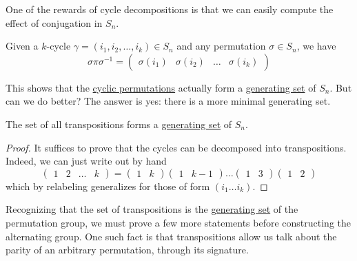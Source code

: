   One of the rewards of cycle decompositions is that we can easily compute the effect of conjugation in $S_n$. 

  \begin{lemma}
    \label{thm:conjugation-is-easy-with-cycle-notation}
    Given a $k$-cycle $\gamma = (i_1, i_2, \ldots, i_k) \in S_n$ and any permutation $\sigma \in S_n$, we have 
    \begin{equation}
      \sigma \pi \sigma^{-1} = \begin{pmatrix} \sigma(i_1) & \sigma(i_2) & \ldots & \sigma(i_k) \end{pmatrix}
    \end{equation}
  \end{lemma}

  This shows that the \hyperref[def:cyclic-permutation]{cyclic permutations} actually form a \hyperref[def:generating-set]{generating set} of $S_n$. But can we do better? The answer is yes: there is a more minimal generating set. 

  \begin{corollary}
		\label{thm:transposition_decomposition}
    The set of all transpositions forms a \hyperref[def:generating-set]{generating set} of $S_{n}$. 
  \end{corollary}
  \begin{proof}
    It suffices to prove that the cycles can be decomposed into transpositions. Indeed, we can just write out by hand 
    \begin{equation}
      \begin{pmatrix} 1 & 2 & \ldots & k \end{pmatrix} = \begin{pmatrix} 1 & k \end{pmatrix} \begin{pmatrix} 1 & k-1 \end{pmatrix} \ldots \begin{pmatrix} 1 & 3 \end{pmatrix} \begin{pmatrix} 1 & 2 \end{pmatrix}
    \end{equation}
    which by relabeling generalizes for those of form $(i_1 \ldots i_k)$. 
  \end{proof}

  Recognizing that the set of transpositions is the \hyperref[def:generating-set]{generating set} of the permutation group, we must prove a few more statements before constructing the alternating group. One such fact is that transpositions allow us talk about the parity of an arbitrary permutation, through its signature. 

